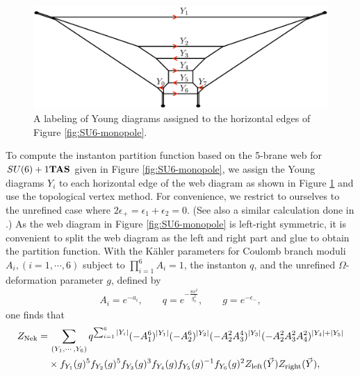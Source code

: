 \begin{figure}[t]
\centering
\includegraphics[width=12cm]{SU6young.pdf}
\caption{A labeling of Young diagrams assigned to the horizontal edges of Figure \ref{fig:SU6-monopole}.}
\label{fig:SU6young}
\end{figure}
To compute the instanton partition function based on the 5-brane web for $SU(6)+1{\bf TAS}$ given in Figure \ref{fig:SU6-monopole}, we assign the Young diagrams $Y_i$ to each horizontal edge of the web diagram as shown in Figure \ref{fig:SU6young} and use the topological vertex method. For convenience, we restrict to ourselves to the unrefined case where $2\epsilon_+=\epsilon_1+\epsilon_2=0$. (See also a similar calculation done in \cite{Hayashi:2019yxj}.) As the web diagram in Figure \ref{fig:SU6-monopole} is left-right symmetric, it is convenient to split the web diagram as the left and right part and glue to obtain the partition function. With the K\"ahler parameters for Coulomb branch moduli $A_i, (i=1, \cdots, 6)$ subject to $\prod_{i=1}^{6}A_i =1$, the instanton $q$, and the unrefined $\Omega$-deformation parameter $g$, defined by 
\begin{align}
A_i = e^{-a_i}
, \qquad q = e^{-\frac{8\pi^2}{g_0^2}}%
, \qquad g=e^{-\epsilon_-},
\end{align}
one finds that 
\begin{align}
  \label{eq:znek-su6}
  Z_{\text{Nek}} 
  =&\, \sum_{(Y_1, \cdots, Y_6)}q^{\sum_{i=1}^6|Y_i|} (-A_1^6)^{|Y_1|}(-A_2^6)^{|Y_2|}(-A_2^2A_3^4)^{|Y_3|}(-A_2^2A_3^2A_4^2)^{|Y_4| + |Y_5|}\nonumber\\
  &\times f_{Y_1}(g)^5f_{Y_2}(g)^5f_{Y_3}(g)^3f_{Y_4}(g)f_{Y_5}(g)^{-1}f_{Y_6}(g)^{2}
  Z_{\text{left}}(\vec{Y})Z_{\text{right}}(\vec{Y}),
\end{align}
